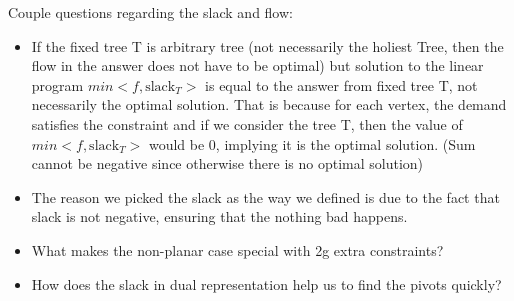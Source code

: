 \documentclass{article}
\begin{document}
Couple questions regarding the slack and flow:
\begin{itemize}
\item If the fixed tree T is arbitrary tree (not necessarily the holiest Tree, 
then the flow in the answer does not have to be optimal) but solution to the 
linear program $min <f, \text{slack}_T>$ is equal to the answer from fixed tree T, 
not necessarily the optimal solution. That is because for each vertex, the 
demand satisfies the constraint and if we consider the tree T, then the value of 
$min <f, \text{slack}_T>$ would be 0, implying it is the optimal solution. 
(Sum cannot be negative since otherwise there is no optimal solution)
\item The reason we picked the slack as the way we defined is due to the fact 
that slack is not negative, ensuring that the nothing bad happens.
\item What makes the non-planar case special with 2g extra constraints?
\item How does the slack in dual representation help us to find the pivots quickly?
\end{itemize}
\end{document}

